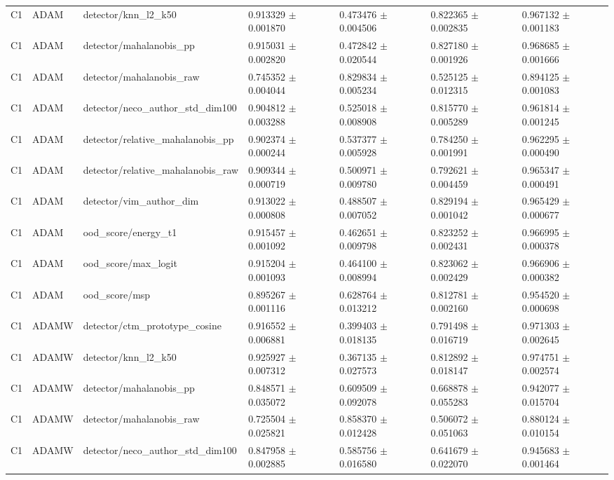 \begin{longtable}{lllllll}
C1 & ADAM & detector/knn\_l2\_k50 & 0.913329 $\pm$ 0.001870 & 0.473476 $\pm$ 0.004506 & 0.822365 $\pm$ 0.002835 & 0.967132 $\pm$ 0.001183 \\
C1 & ADAM & detector/mahalanobis\_pp & 0.915031 $\pm$ 0.002820 & 0.472842 $\pm$ 0.020544 & 0.827180 $\pm$ 0.001926 & 0.968685 $\pm$ 0.001666 \\
C1 & ADAM & detector/mahalanobis\_raw & 0.745352 $\pm$ 0.004044 & 0.829834 $\pm$ 0.005234 & 0.525125 $\pm$ 0.012315 & 0.894125 $\pm$ 0.001083 \\
C1 & ADAM & detector/neco\_author\_std\_dim100 & 0.904812 $\pm$ 0.003288 & 0.525018 $\pm$ 0.008908 & 0.815770 $\pm$ 0.005289 & 0.961814 $\pm$ 0.001245 \\
C1 & ADAM & detector/relative\_mahalanobis\_pp & 0.902374 $\pm$ 0.000244 & 0.537377 $\pm$ 0.005928 & 0.784250 $\pm$ 0.001991 & 0.962295 $\pm$ 0.000490 \\
C1 & ADAM & detector/relative\_mahalanobis\_raw & 0.909344 $\pm$ 0.000719 & 0.500971 $\pm$ 0.009780 & 0.792621 $\pm$ 0.004459 & 0.965347 $\pm$ 0.000491 \\
C1 & ADAM & detector/vim\_author\_dim & 0.913022 $\pm$ 0.000808 & 0.488507 $\pm$ 0.007052 & 0.829194 $\pm$ 0.001042 & 0.965429 $\pm$ 0.000677 \\
C1 & ADAM & ood\_score/energy\_t1 & 0.915457 $\pm$ 0.001092 & 0.462651 $\pm$ 0.009798 & 0.823252 $\pm$ 0.002431 & 0.966995 $\pm$ 0.000378 \\
C1 & ADAM & ood\_score/max\_logit & 0.915204 $\pm$ 0.001093 & 0.464100 $\pm$ 0.008994 & 0.823062 $\pm$ 0.002429 & 0.966906 $\pm$ 0.000382 \\
C1 & ADAM & ood\_score/msp & 0.895267 $\pm$ 0.001116 & 0.628764 $\pm$ 0.013212 & 0.812781 $\pm$ 0.002160 & 0.954520 $\pm$ 0.000698 \\
C1 & ADAMW & detector/ctm\_prototype\_cosine & 0.916552 $\pm$ 0.006881 & 0.399403 $\pm$ 0.018135 & 0.791498 $\pm$ 0.016719 & 0.971303 $\pm$ 0.002645 \\
C1 & ADAMW & detector/knn\_l2\_k50 & 0.925927 $\pm$ 0.007312 & 0.367135 $\pm$ 0.027573 & 0.812892 $\pm$ 0.018147 & 0.974751 $\pm$ 0.002574 \\
C1 & ADAMW & detector/mahalanobis\_pp & 0.848571 $\pm$ 0.035072 & 0.609509 $\pm$ 0.092078 & 0.668878 $\pm$ 0.055283 & 0.942077 $\pm$ 0.015704 \\
C1 & ADAMW & detector/mahalanobis\_raw & 0.725504 $\pm$ 0.025821 & 0.858370 $\pm$ 0.012428 & 0.506072 $\pm$ 0.051063 & 0.880124 $\pm$ 0.010154 \\
C1 & ADAMW & detector/neco\_author\_std\_dim100 & 0.847958 $\pm$ 0.002885 & 0.585756 $\pm$ 0.016580 & 0.641679 $\pm$ 0.022070 & 0.945683 $\pm$ 0.001464 \\

\end{longtable}
